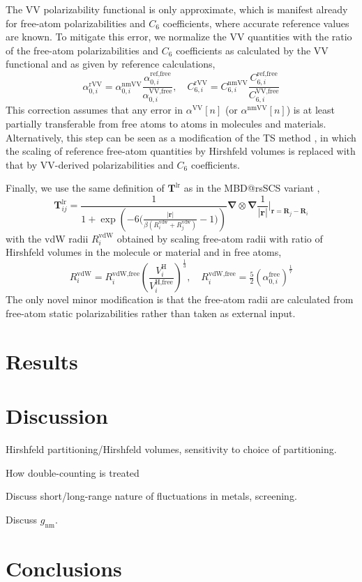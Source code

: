 The VV polarizability functional is only approximate, which is manifest already for free-atom polarizabilities and $C_6$ coefficients, where accurate reference values are known.
To mitigate this error, we normalize the VV quantities with the ratio of the free-atom polarizabilities and $C_6$ coefficients as calculated by the VV functional and as given by reference calculations,
\begin{equation}
  \alpha_{0,i}^\text{rVV}=\alpha_{0,i}^\text{nmVV}\frac{\alpha_{0,i}^\text{ref,free}}{\alpha_{0,i}^\text{VV,free}},\quad
  C_{6,i}^\text{rVV}=C_{6,i}^\text{nmVV}\frac{C_{6,i}^\text{ref,free}}{C_{6,i}^\text{VV,free}}
\end{equation}
This correction assumes that any error in $\alpha^\text{VV}[n]$ (or $\alpha^\text{nmVV}[n]$) is at least partially transferable from free atoms to atoms in molecules and materials.
Alternatively, this step can be seen as a modification of the TS method \citep{TkatchenkoPRL09}, in which the scaling of reference free-atom quantities by Hirshfeld volumes is replaced with that by VV-derived polarizabilities and $C_6$ coefficients.

Finally, we use the same definition of $\mathbf T^\text{lr}$ as in the MBD@rsSCS variant \citep{AmbrosettiJCP14},
\begin{equation}
  \mathbf T_{ij}^\text{lr}=\frac1{1+\exp\left(-6\Big(\frac{|\mathbf r|}{\beta(R_i^\text{vdw}+R_j^\text{vdw})}-1\Big)\!\!\right)}\boldsymbol\nabla\otimes\boldsymbol\nabla\frac1{|\mathbf r|}\Bigg|_{\mathbf r=\mathbf R_j-\mathbf R_i}
\end{equation}
with the vdW radii $R_i^\text{vdW}$ obtained by scaling free-atom radii with ratio of Hirshfeld volumes in the molecule or material and in free atoms,
\begin{equation}
  R_i^\text{vdW}=R_i^\text{vdW,free}{\left(\frac{V_i^\text{H}}{V_i^\text{H,free}}\right)}^\frac13,\quad
  R_i^\text{vdW,free}=\tfrac52{(\alpha_{0,i}^\text{free})}^\frac17
\end{equation}
The only novel minor modification is that the free-atom radii are calculated from free-atom static polarizabilities \citep{FedorovPRL18} rather than taken as external input.

\section{Results}

\section{Discussion}

Hirshfeld partitioning/Hirshfeld volumes, sensitivity to choice of partitioning.

How double-counting is treated

Discuss short/long-range nature of fluctuations in metals, screening.

Discuss $g_\text{nm}$.

\section{Conclusions}

